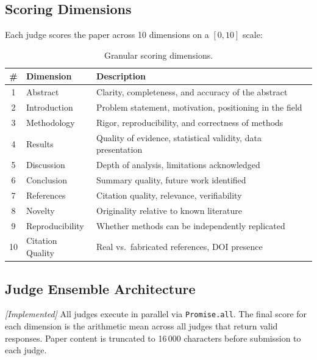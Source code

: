 \documentclass[11pt,a4paper]{article}
\theoremstyle{plain}
\theoremstyle{definition}
\theoremstyle{remark}
\begin{document}
\subsection{Scoring Dimensions}

Each judge scores the paper across 10 dimensions on a $[0,10]$ scale:

\begin{table}[ht]
\centering
\caption{Granular scoring dimensions.}
\label{tab:scoring}
\small\begin{tabular}{@{}clp{9cm}@{}}
\toprule
\textbf{\#} & \textbf{Dimension} & \textbf{Description} \\
\midrule
1  & Abstract       & Clarity, completeness, and accuracy of the abstract \\
2  & Introduction   & Problem statement, motivation, positioning in the field \\
3  & Methodology    & Rigor, reproducibility, and correctness of methods \\
4  & Results        & Quality of evidence, statistical validity, data presentation \\
5  & Discussion     & Depth of analysis, limitations acknowledged \\
6  & Conclusion     & Summary quality, future work identified \\
7  & References     & Citation quality, relevance, verifiability \\
8  & Novelty        & Originality relative to known literature \\
9  & Reproducibility & Whether methods can be independently replicated \\
10 & Citation Quality & Real vs.\ fabricated references, DOI presence \\
\bottomrule
\end{tabular}
\end{table}

\subsection{Judge Ensemble Architecture}

\emph{[Implemented]} All judges execute in parallel via \texttt{Promise.all}.  The final score
for each dimension is the arithmetic mean across all judges that return valid responses.  Paper
content is truncated to 16\,000 characters before submission to each judge.
\end{document}
